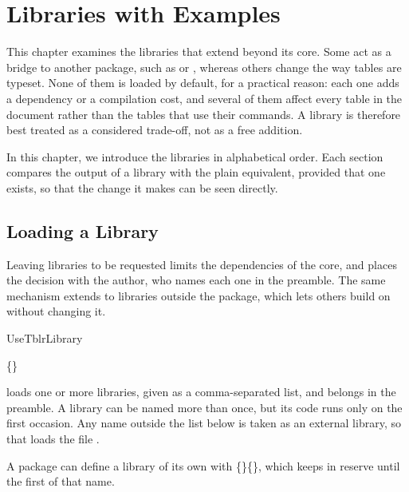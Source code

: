 \chapter{Libraries with Examples}\label{lib}
This chapter examines the libraries that extend  beyond its core. Some act as a bridge to another package, such as  or , whereas others change the way tables are typeset. None of them is loaded by default, for a practical reason: each one adds a dependency or a compilation cost, and several of them affect every table in the document rather than the tables that use their commands. A library is therefore best treated as a considered trade-off, not as a free addition.

In this chapter, we introduce the libraries in alphabetical order. Each section compares the output of a library with the plain equivalent, provided that one exists, so that the change it makes can be seen directly.

\section{Loading a Library}\label{lib:loading}
Leaving libraries to be requested limits the dependencies of the core, and places the decision with the author, who names each one in the preamble. The same mechanism extends to libraries outside the package, which lets others build on  without changing it.

\begin{codedescribe}[
        code,
        new=2021L,
        update=2024A,
        update=2025A
    ]{UseTblrLibrary}
    \begin{codesyntax}
        \{\}
    \end{codesyntax}
     loads one or more libraries, given as a comma-separated list, and belongs in the preamble. A library can be named more than once, but its code runs only on the first occasion. Any name outside the list below is taken as an external library, so that  loads the file .

    \begin{codestore}[st=lib:use]
        \usepackage{tabularray}
        \end{codestore}
    \begin{tsremark}
        A package can define a library of its own with \tsobj[code]{\NewTblrLibrary}\{\}\{\}, which keeps  in reserve until the first  of that name.
    \end{tsremark}
\end{codedescribe}

